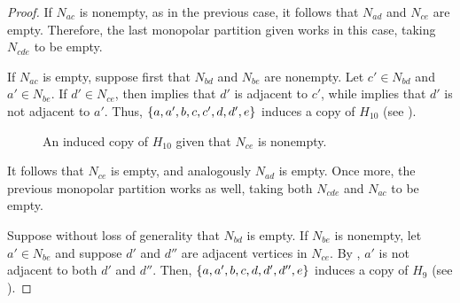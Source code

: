 \begin{proof}
    If $N_{ac}$ is nonempty, as in the previous case, it follows that $N_{ad}$
    and $N_{ce}$ are empty. Therefore, the last monopolar partition given works
    in this case, taking $N_{cde}$ to be empty. 
    
    If $N_{ac}$ is empty, suppose first that $N_{bd}$ and $N_{be}$ are nonempty.
    Let $c'\in N_{bd}$ and $a'\in N_{be}$. If $d'\in N_{ce}$, then
     implies that $d'$ is adjacent to $c'$, while
     implies that $d'$ is not adjacent to $a'$. Thus,
    $\left\{a,a',b,c,c',d,d',e\right\}$ induces a copy of $H_{10}$ (see
    ).

    \begin{figure}[htb!]
        \centering
        \caption{An induced copy of $H_{10}$ given that $N_{ce}$ is nonempty.}
        \label{fig:2_bag_nonempty_2}
    \end{figure}
    
    It follows that $N_{ce}$ is empty, and analogously $N_{ad}$ is empty. Once
    more, the previous monopolar partition works as well, taking both $N_{cde}$
    and $N_{ac}$ to be empty.

    Suppose without loss of generality that $N_{bd}$ is empty. If $N_{be}$ is
    nonempty, let $a'\in N_{be}$ and suppose $d'$ and $d''$ are adjacent
    vertices in $N_{ce}$. By , $a'$ is not adjacent to
    both $d'$ and $d''$. Then, $\left\{a,a',b,c,d,d',d'',e\right\}$ induces a copy of $H_9$
    (see ).


\end{proof}
